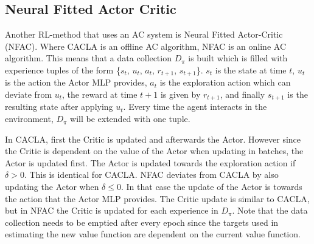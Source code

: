 
\subsection{Neural Fitted Actor Critic}
Another RL-method that uses an AC system is Neural Fitted Actor-Critic (NFAC). Where CACLA is an offline AC algorithm, NFAC is an online AC algorithm. This means that a data collection $D_{\pi}$ is built which is filled with experience tuples of the form \{$s_{t}$, $u_{t}$, $a_{t}$, $r_{t+1}$, $s_{t+1}$\}. $s_{t}$ is the state at time $t$, $u_{t}$ is the action the Actor MLP provides, $a_{t}$ is the exploration action which can deviate from $u_{t}$, the reward at time $t+1$ is given by $r_{t+1}$, and finally $s_{t+1}$ is the resulting state after applying $u_{t}$. Every time the agent interacts in the environment, $D_{\pi}$ will be extended with one tuple.

In CACLA, first the Critic is updated and afterwards the Actor. However since the Critic is dependent on the value of the Actor when updating in batches, the Actor is updated first. The Actor is updated towards the exploration action if $\delta > 0$. This is identical for CACLA. NFAC deviates from CACLA by also updating the Actor when $\delta \leq 0$. In that case the update of the Actor is towards the action that the Actor MLP provides. The Critic update is similar to CACLA, but in NFAC the Critic is updated for each experience in $D_{\pi}$. Note that the data collection needs to be emptied after every epoch since the targets used in estimating the new value function are dependent on the current value function. 

